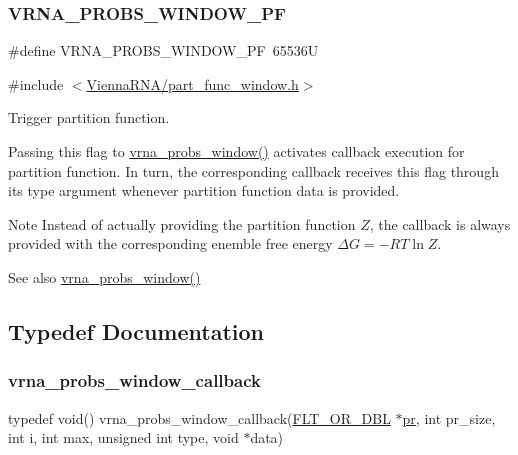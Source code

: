 \subsubsection{\texorpdfstring{V\+R\+N\+A\+\_\+\+P\+R\+O\+B\+S\+\_\+\+W\+I\+N\+D\+O\+W\+\_\+\+PF}{VRNA\_PROBS\_WINDOW\_PF}}
{\footnotesize\ttfamily \#define V\+R\+N\+A\+\_\+\+P\+R\+O\+B\+S\+\_\+\+W\+I\+N\+D\+O\+W\+\_\+\+PF~65536U}



{\ttfamily \#include $<$\hyperlink{part__func__window_8h}{Vienna\+R\+N\+A/part\+\_\+func\+\_\+window.\+h}$>$}



Trigger partition function. 

Passing this flag to \hyperlink{group__part__func__window_ga7115d012988541a65ec323c5f17a334b}{vrna\+\_\+probs\+\_\+window()} activates callback execution for partition function. In turn, the corresponding callback receives this flag through it\textquotesingle{}s {\ttfamily type} argument whenever partition function data is provided.

\begin{DoxyNote}{Note}
Instead of actually providing the partition function $Z$, the callback is always provided with the corresponding enemble free energy $\Delta G = - RT \ln Z$.
\end{DoxyNote}
\begin{DoxySeeAlso}{See also}
\hyperlink{group__part__func__window_ga7115d012988541a65ec323c5f17a334b}{vrna\+\_\+probs\+\_\+window()} 
\end{DoxySeeAlso}


\subsection{Typedef Documentation}
\mbox{\label{group__part__func__window_gabe710a1182e6db69cc75329dfc9bed67}} 
\subsubsection{\texorpdfstring{vrna\+\_\+probs\+\_\+window\+\_\+callback}{vrna\_probs\_window\_callback}}
{\footnotesize\ttfamily typedef void() vrna\+\_\+probs\+\_\+window\+\_\+callback(\hyperlink{group__data__structures_ga31125aeace516926bf7f251f759b6126}{F\+L\+T\+\_\+\+O\+R\+\_\+\+D\+BL} $\ast$\hyperlink{fold__vars_8h_ac98ec419070aee6831b44e5c700f090f}{pr}, int pr\+\_\+size, int i, int max, unsigned int type, void $\ast$data)}




